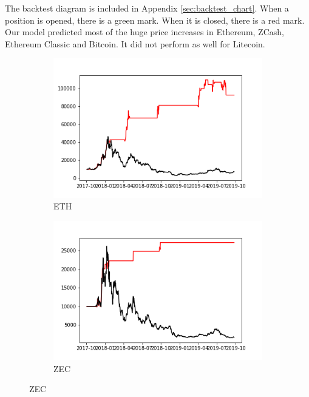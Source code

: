 \documentclass[letterpaper]{article}
\begin{document}
The backtest diagram is included in Appendix \ref{sec:backtest_chart}. When a position is opened, there 
is a green mark. When it is closed, there is a red mark. Our model predicted most of the huge price increases in Ethereum,
ZCash, Ethereum Classic and Bitcoin. It did not perform as well for Litecoin. \par

\begin{figure}[H]
    \centering
    \captionsetup{justification=centering}

    \begin{subfigure}[b]{0.4\linewidth}
      \includegraphics[width=\linewidth]{images/portfolio/ETH.png}
      \caption{ETH}
    \end{subfigure}
    \begin{subfigure}[b]{0.4\linewidth}
      \includegraphics[width=\linewidth]{images/portfolio/ZEC.png}
      \caption{ZEC}

\end{subfigure}
\end{figure}
\end{document}
